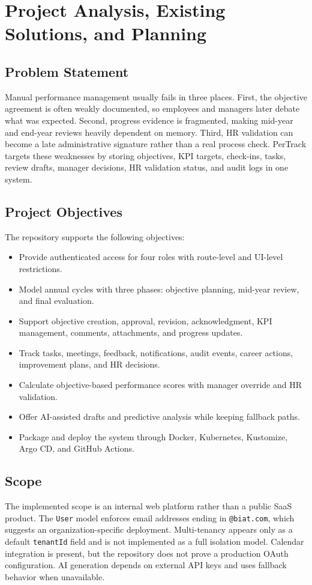 \chapter{Project Analysis, Existing Solutions, and Planning}
\section{Problem Statement}
Manual performance management usually fails in three places. First, the objective agreement is often weakly documented, so employees and managers later debate what was expected. Second, progress evidence is fragmented, making mid-year and end-year reviews heavily dependent on memory. Third, HR validation can become a late administrative signature rather than a real process check. PerTrack targets these weaknesses by storing objectives, KPI targets, check-ins, tasks, review drafts, manager decisions, HR validation status, and audit logs in one system.

\section{Project Objectives}
The repository supports the following objectives:
\begin{itemize}
\item Provide authenticated access for four roles with route-level and UI-level restrictions.
\item Model annual cycles with three phases: objective planning, mid-year review, and final evaluation.
\item Support objective creation, approval, revision, acknowledgment, KPI management, comments, attachments, and progress updates.
\item Track tasks, meetings, feedback, notifications, audit events, career actions, improvement plans, and HR decisions.
\item Calculate objective-based performance scores with manager override and HR validation.
\item Offer AI-assisted drafts and predictive analysis while keeping fallback paths.
\item Package and deploy the system through Docker, Kubernetes, Kustomize, Argo CD, and GitHub Actions.
\end{itemize}

\section{Scope}
The implemented scope is an internal web platform rather than a public SaaS product. The \texttt{User} model enforces email addresses ending in \texttt{@biat.com}, which suggests an organization-specific deployment. Multi-tenancy appears only as a default \texttt{tenantId} field and is not implemented as a full isolation model. Calendar integration is present, but the repository does not prove a production OAuth configuration. AI generation depends on external API keys and uses fallback behavior when unavailable.

